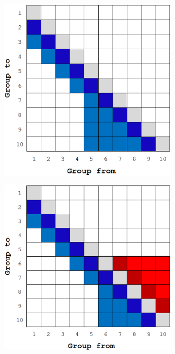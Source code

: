 \begin{figure}
\centering
	\begin{subfigure}[b]{0.58\textwidth}
		\centering
		\includegraphics[width=\textwidth]{figures/sec_Sn/scattering_matrix_NO_upscattering.eps}
		\vspace{4mm}
	\end{subfigure}
	\hfill
	\begin{subfigure}[b]{0.58\textwidth}
		\centering
		\includegraphics[width=\textwidth]{figures/sec_Sn/scattering_matrix_w_upscattering.eps}

\end{subfigure}
\end{figure}
